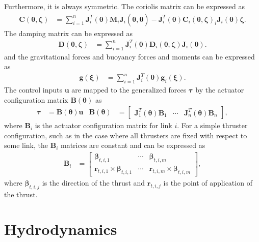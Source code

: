 Furthermore, it is always symmetric. The coriolis matrix can be expressed as
\begin{align}
    \bm{C}(\bm{\theta}, \bm{\zeta}) &=
    \sum_{i=1}^{n} \bm{J}_{i}^T(\bm{\theta}) \bm{M}_i \dot{\bm{J}}_{i}(\bm{\theta},\dot{\bm{\theta}})
    -\bm{J}_{i}^T(\bm{\theta}) \bm{C}_i(\bm{\theta},\bm{\zeta})_i \bm{J}_{i}(\bm{\theta}) \bm{\zeta}.
\end{align}
The damping matrix can be expressed as
\begin{align}
    \bm{D}(\bm{\theta}, \bm{\zeta}) &=
    \sum_{i=1}^{n} \bm{J}_{i}^T(\bm{\theta}) \bm{D}_i(\bm{\theta},\bm{\zeta}) \bm{J}_{i}(\bm{\theta}).
\end{align}
and the gravitational forces and buoyancy forces and moments can be expressed as
\begin{align}
    \bm{g}(\bm{\xi}) &=
    \sum_{i=1}^{n} \bm{J}_{i}^T(\bm{\theta}) \bm{g}_i(\bm{\xi}).
\end{align}
The control inputs $\bm{u}$ are mapped to the generalized forces $\bm{\tau}$ by
the actuator configuration matrix $\bm{B}(\bm{\theta})$ as
\begin{align}
    \bm{\tau} &= \bm{B}(\bm{\theta}) \bm{u} &
    \bm{B}(\bm{\theta}) &= \begin{bmatrix}
        \bm{J}_1^T(\bm{\theta}) \bm{B}_1 & \cdots & \bm{J}_n^T(\bm{\theta}) \bm{B}_n
    \end{bmatrix},
\end{align}
where $\bm{B}_i$ is the actuator configuration matrix for link $i$. For a simple
thruster configuration, such as in the case where all thrusters are fixed with
respect to some link, the $\bm{B}_i$ matrices are constant and can be expressed
as
\begin{align}
    \bm{B}_i &= \begin{bmatrix}
        \bm{\beta}_{t,i,1} & \cdots & \bm{\beta}_{t,i,m} \\
        \bm{r}_{t,i,1} \times \bm{\beta}_{t,i,1} & \cdots & \bm{r}_{t,i,m} \times \bm{\beta}_{t,i,m}
    \end{bmatrix},
\end{align}
where $\bm{\beta}_{t,i,j}$ is the direction of the thrust and $\bm{r}_{t,i,j}$
is the point of application of the thrust.





\section{Hydrodynamics}
\label{sec:hydrodynamics}


